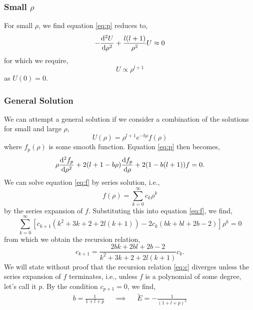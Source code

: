 \documentclass{book}
\begin{document}
\subsubsection{Small $\rho$}
For small $\rho$, we find equation \eqref{eq:p} reduces to,
\begin{equation}
	-\dv[2]{U}{\rho} + \frac{l(l+1)}{\rho^2}U \approx 0
\end{equation}
for which we require,
\begin{equation}
	U \propto \rho^{l+1}
\end{equation}
as $U(0) = 0$.
\subsubsection{General Solution}
We can attempt a general solution if we consider a combination of the solutions for small and large $\rho$,
\begin{equation}
	U(\rho) = \rho^{l+1}e^{-b\rho}f(\rho)
\end{equation}
where $f_p(\rho)$ is some smooth function. Equation \eqref{eq:p} then becomes,
\begin{equation}
	\rho\dv[2]{f_p}{\rho} + 2(l + 1 - b\rho)\dv{f_p}{\rho}  + 2(1 - b(l+1))f = 0. \label{eq:f}
\end{equation} 
We can solve equation \eqref{eq:f} by series solution, i.e.,
\begin{equation}
	f(\rho) = \sum_{k=0}^{\infty}c_k\rho^k
\end{equation}
by the series expansion of $f$. Substituting this into equation \eqref{eq:f}, we find,
\begin{equation}
	\sum_{k=0}^{\infty}\left[c_{k+1} \left(k^2 + 3k + 2 + 2l(k+1)\right) -2c_k\left(bk + bl + 2b - 2\right)\right]\rho^{k} = 0
\end{equation}
from which we obtain the recursion relation,
\begin{equation}
	c_{k+1} = \frac{2bk + 2bl + 2b - 2}{k^2 + 3k + 2 + 2l(k+1)}c_k. \label{eq:c}
\end{equation}
We will state without proof that the recursion relation \eqref{eq:c} diverges unless the series expansion of $f$ terminates, i.e., unless $f$ is a polynomial of some degree, let's call it $p$. By the condition $c_{p+1} = 0$, we find,
\begin{align}
	b = \frac{1}{1 + l + p} && \implies && \tilde{E} = -\frac{1}{(1 + l + p)^2}
\end{align}
\end{document}
